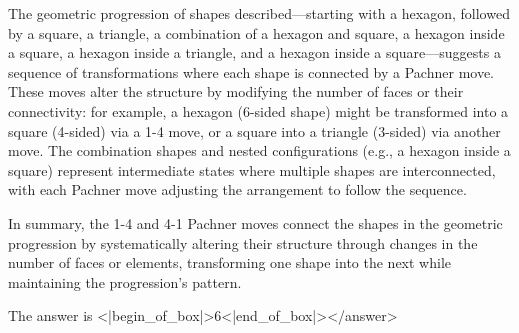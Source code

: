 The geometric progression of shapes described—starting with a hexagon, followed by a square, a triangle, a combination of a hexagon and square, a hexagon inside a square, a hexagon inside a triangle, and a hexagon inside a square—suggests a sequence of transformations where each shape is connected by a Pachner move. These moves alter the structure by modifying the number of faces or their connectivity: for example, a hexagon (6-sided shape) might be transformed into a square (4-sided) via a 1-4 move, or a square into a triangle (3-sided) via another move. The combination shapes and nested configurations (e.g., a hexagon inside a square) represent intermediate states where multiple shapes are interconnected, with each Pachner move adjusting the arrangement to follow the sequence.

In summary, the 1-4 and 4-1 Pachner moves connect the shapes in the geometric progression by systematically altering their structure through changes in the number of faces or elements, transforming one shape into the next while maintaining the progression's pattern.  

The answer is <|begin_of_box|>6<|end_of_box|></answer>